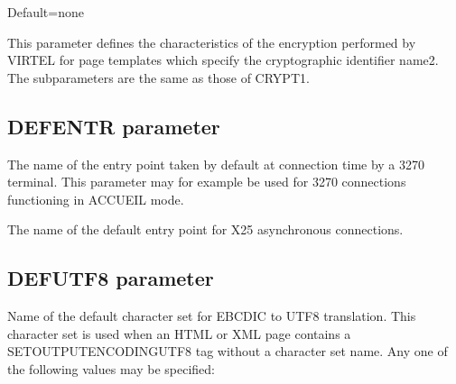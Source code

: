 \documentclass[letterpaper,10pt,english]{sphinxmanual}
\begin{document}
\sphinxAtStartPar
Default=none

\sphinxAtStartPar
This parameter defines the characteristics of the encryption performed by VIRTEL for page templates which specify the cryptographic identifier name2. The subparameters are the same as those of CRYPT1.

\ignorespaces 

\subsection{DEFENTR parameter}
\label{\detokenize{Installation_Guide:defentr-parameter}}\label{\detokenize{Installation_Guide:index-51}}
\begin{sphinxVerbatim}[commandchars=\\\{\}]
 
\end{sphinxVerbatim}

\sphinxAtStartPar
{} \sphinxhyphen{} The name of the entry point taken by default at connection time by a 3270 terminal. This parameter may for example be used for 3270 connections functioning in ACCUEIL mode.

\sphinxAtStartPar
{} \sphinxhyphen{} The name of the default entry point for X25 asynchronous connections.

\ignorespaces 

\subsection{DEFUTF8 parameter}
\label{\detokenize{Installation_Guide:defutf8-parameter}}\label{\detokenize{Installation_Guide:index-52}}
\begin{sphinxVerbatim}[commandchars=\\\{\}]
 
\end{sphinxVerbatim}

\sphinxAtStartPar
{} \sphinxhyphen{} Name of the default character set for EBCDIC to UTF\sphinxhyphen{}8 translation. This character set is used when an HTML or XML page contains a SET\sphinxhyphen{}OUTPUT\sphinxhyphen{}ENCODING\sphinxhyphen{}UTF\sphinxhyphen{}8 tag without a character set name. Any one of the following values may be specified:
\end{document}

